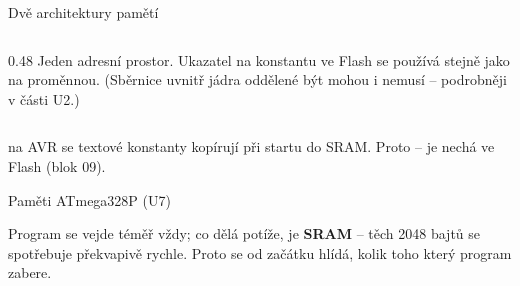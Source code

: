 \documentclass[12pt,aspectratio=169]{beamer}
\begin{document}
\begin{frame}{Dvě architektury pamětí}
\begin{columns}[T]
\begin{column}{0.48\textwidth}
      \vspace{1mm}
      \scriptsize Jeden adresní prostor. Ukazatel na konstantu ve Flash se
      používá stejně jako na proměnnou. (Sběrnice uvnitř jádra oddělené být
      mohou i nemusí -- podrobněji v části U2.)
    \end{column}
  \end{columns}
  \vspace{1mm}
  \scriptsize
   na AVR se textové konstanty kopírují při startu do SRAM.
  Proto  --  je nechá ve Flash (blok 09).
\end{frame}

\begin{frame}{Paměti ATmega328P (U7)}
  \vspace{2mm}
  \begin{center}
  \end{center}
  \vspace{3mm}
  \small
   Program se vejde téměř vždy;
  co dělá potíže, je \textbf{SRAM} -- těch 2048 bajtů se spotřebuje překvapivě rychle.
  Proto se od začátku hlídá, kolik toho který program zabere.
\end{frame}
\end{document}

